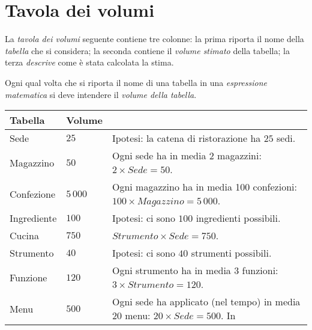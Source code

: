 \section{Tavola dei volumi}\label{sec:volumetable}
La {\it tavola dei volumi} seguente contiene tre colonne: la prima riporta il nome della
{\it tabella} che si considera; la seconda contiene il {\it volume stimato} della tabella; la terza
{\it descrive} come è stata calcolata la stima.

Ogni qual volta che si riporta il nome di una tabella in una {\it espressione matematica} si deve
intendere il {\it volume della tabella}.

{\tabulinesep=3pt
\begin{longtabu} to 
\hline\rowfont\bfseries
{\Large Tabella}& Volume        & 
\\ \hline \hline \hline \hline \hline %
\endhead
Sede            & \(25\)        & Ipotesi: la catena di ristorazione ha \(25\) sedi.
    \\ \hline %
Magazzino       & \(50\)        & Ogni sede ha in media 2 magazzini: \(2 \times Sede = 50\).
    \\ \hline %
Confezione      & \(5\,000\)    & Ogni magazzino ha in media 100 confezioni: \(100 \times Magazzino = 5\,000\).
    \\ \hline %
Ingrediente     & \(100\)       & Ipotesi: ci sono \(100\) ingredienti possibili.
    \\ \hline %
Cucina          & \(750\)       & \(Strumento \times Sede = 750\).
    \\ \hline %
Strumento       & \(40\)        & Ipotesi: ci sono \(40\) strumenti possibili.
    \\ \hline %
Funzione        & \(120\)       & Ogni strumento ha in media 3 funzioni: \(3 \times Strumento = 120\).
    \\ \hline %
Menu            & \(500\)       & Ogni sede ha applicato (nel tempo) in media 20 menu: \(20 \times Sede = 500\). In

\end{longtabu}}
